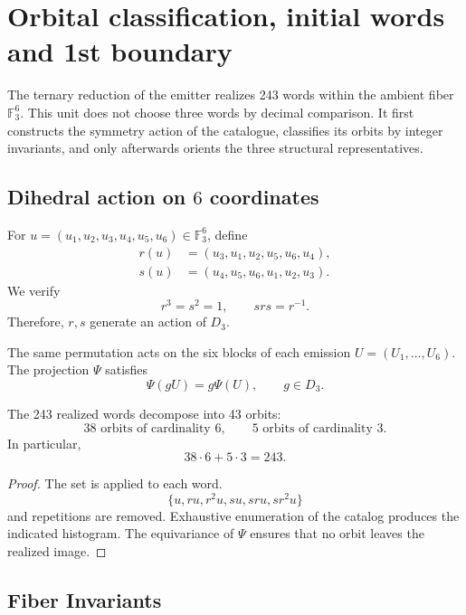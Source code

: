 
\chapter{Orbital classification, initial words and 1st boundary}
\label{chap:orbitas-elevacion-r36}

The ternary reduction of the emitter realizes 243 words within the ambient
fiber \(\mathbb F_3^6\). This unit does not choose three words by
decimal comparison. It first constructs the symmetry action of the catalogue,
classifies its orbits by integer invariants, and only afterwards orients
the three structural representatives.

\section{Dihedral action on \(6\) coordinates}

For \(u=(u_1,u_2,u_3,u_4,u_5,u_6)\in\mathbb F_3^6\), define
\begin{align*}
 r(u)&=(u_3,u_1,u_2,u_5,u_6,u_4),\\
 s(u)&=(u_4,u_5,u_6,u_1,u_2,u_3).
\end{align*}
We verify
\[
 r^3=s^2=1,
 \qquad srs=r^{-1}.
\]
Therefore, \(r,s\) generate an action of \(D_3\).

The same permutation acts on the six blocks of each emission
\(U=(U_1,\ldots,U_6)\). The projection \(\Psi\) satisfies
\[
 \Psi(gU)=g\Psi(U),
 \qquad g\in D_3.
\]

\begin{theorem}
\label{thm:catalogo-descomposicion-d3}
The 243 realized words decompose into 43 orbits:
\[
 38\text{ orbits of cardinality }6,
 \qquad
 5\text{ orbits of cardinality }3.
\]
In particular,
\[
 38\cdot6+5\cdot3=243.
\]
\end{theorem}

\begin{proof}
The set is applied to each word.
\[
 \{u,ru,r^2u,su,sru,sr^2u\}
\]
and repetitions are removed. Exhaustive enumeration of the catalog produces
the indicated histogram. The equivariance of \(\Psi\) ensures that no
orbit leaves the realized image.
\end{proof}

\section{Fiber Invariants}

